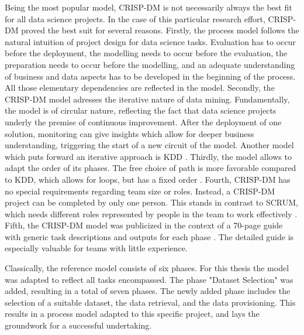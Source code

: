 Being the most popular model, \ac{CRISP-DM} is not necessarily always the best fit for all data science projects. In the case of this particular research effort, \ac{CRISP-DM} proved the best suit for several reasons.
Firstly, the process model follows the natural intuition of project design for data science tasks. Evaluation has to occur before the deployment, the modelling needs to occur before the evaluation, the preparation needs to occur before the modelling, and an adequate understanding of business and data aspects has to be developed in the beginning of the process. All those elementary dependencies are reflected in the model.
Secondly, the \ac{CRISP-DM} model adresses the iterative nature of data mining. Fundamentally, the model is of circular nature, reflecting the fact that data science projects underly the premise of continuous improvement. After the deployment of one solution, monitoring can give insights which allow for deeper business understanding, triggering the start of a new circuit of the model. Another model which puts forward an iterative approach is \ac{KDD} \cite{KDD}.
Thirdly, the model allows to adapt the order of its phases. The free choice of path is more favorable compared to \ac{KDD}, which allows for loops, but has a fixed order \cite{KDD}.
Fourth, \ac{CRISP-DM} has no special requirements regarding team size or roles. Instead, a \ac{CRISP-DM} project can be completed by only one person. This stands in contrast to SCRUM, which needs different roles represented by people in the team to work effectively \cite{SCRUMSolo}. 
Fifth, the \ac{CRISP-DM} model was publicized in the context of a 70-page guide with generic task descriptions and outputs for each phase \cite{CRISPDM2000}. The detailed guide is especially valuable for teams with little experience.

Classically, the reference model consists of six phases. For this thesis the model was adapted to reflect all tasks encompassed. The phase "Dataset Selection" was added, resulting in a total of seven phases. The newly added phase includes the selection of a suitable dataset, the data retrieval, and the data provisioning. This results in a process model adapted to this specific project, and lays the groundwork for a successful undertaking.

 